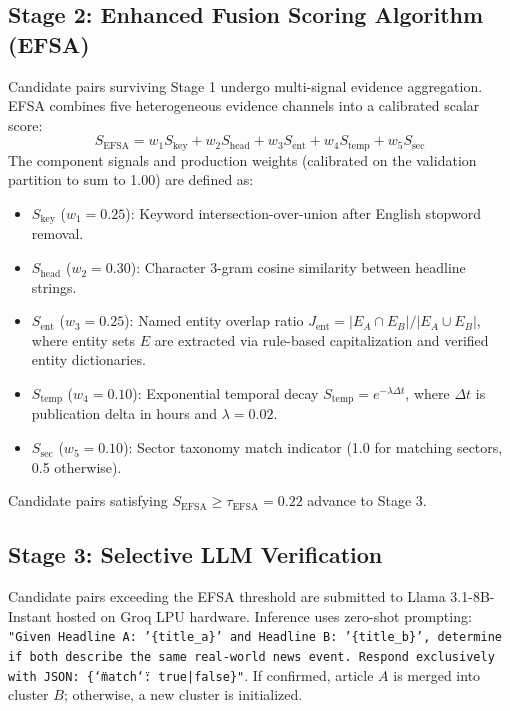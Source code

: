 \documentclass[conference]{IEEEtran}
\begin{document}
\subsection{Stage 2: Enhanced Fusion Scoring Algorithm (EFSA)}
Candidate pairs surviving Stage 1 undergo multi-signal evidence aggregation.
EFSA combines five heterogeneous evidence channels into a calibrated scalar score:
\begin{equation}
S_{\text{EFSA}} = w_1 S_{\text{key}} + w_2 S_{\text{head}} + w_3 S_{\text{ent}} + w_4 S_{\text{temp}} + w_5 S_{\text{sec}}
\label{eq:efsa}
\end{equation}
The component signals and production weights (calibrated on the validation partition to sum to 1.00) are defined as:
\begin{itemize}
    \item $S_{\text{key}}$ ($w_1 = 0.25$): Keyword intersection-over-union after English stopword removal.
    \item $S_{\text{head}}$ ($w_2 = 0.30$): Character 3-gram cosine similarity between headline strings.
    \item $S_{\text{ent}}$ ($w_3 = 0.25$): Named entity overlap ratio $J_{\text{ent}} = |E_A \cap E_B| / |E_A \cup E_B|$, where entity sets $E$ are extracted via rule-based capitalization and verified entity dictionaries.
    \item $S_{\text{temp}}$ ($w_4 = 0.10$): Exponential temporal decay $S_{\text{temp}} = e^{-\lambda \Delta t}$, where $\Delta t$ is publication delta in hours and $\lambda = 0.02$.
    \item $S_{\text{sec}}$ ($w_5 = 0.10$): Sector taxonomy match indicator (1.0 for matching sectors, 0.5 otherwise).
\end{itemize}
Candidate pairs satisfying $S_{\text{EFSA}} \ge \tau_{\text{EFSA}} = 0.22$ advance to Stage 3.

\subsection{Stage 3: Selective LLM Verification}
Candidate pairs exceeding the EFSA threshold are submitted to Llama 3.1-8B-Instant hosted on Groq LPU hardware.
Inference uses zero-shot prompting:
\texttt{"Given Headline A: '\{title\_a\}' and Headline B: '\{title\_b\}', determine if both describe the same real-world news event. Respond exclusively with JSON: \{\char`\"{}match\char`\"{}: true|false\}"}.
If confirmed, article $A$ is merged into cluster $B$; otherwise, a new cluster is initialized.
\end{document}
